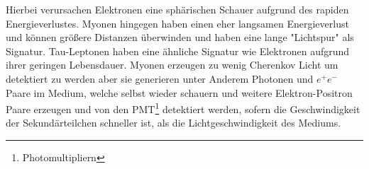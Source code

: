 Hierbei verursachen Elektronen eine sph\"arischen Schauer aufgrund des rapiden 
Energieverlustes. Myonen hingegen haben einen eher langsamen Energieverlust 
und k\"onnen gr\"o\ss ere Distanzen \"uberwinden und haben eine lange "Lichtspur" 
als Signatur. Tau-Leptonen haben eine \"ahnliche Signatur wie Elektronen aufgrund 
ihrer geringen Lebensdauer.
Myonen erzeugen zu wenig Cherenkov Licht um detektiert zu werden aber sie 
generieren unter Anderem 
Photonen und $e^+ e^-$ Paare im Medium, welche selbst wieder schauern 
und weitere Elektron-Positron Paare erzeugen und von den 
PMT\footnote{Photomultipliern} detektiert werden, sofern die Geschwindigkeit 
der Sekundärteilchen schneller ist, als die Lichtgeschwindigkeit des 
Mediums.
